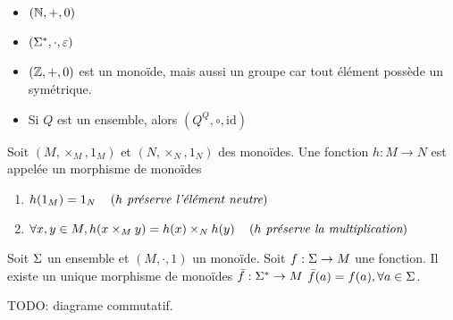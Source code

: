 \begin{exemple}
	\begin{itemize}
		\item $(\mathbb{N}, +, 0)$
		\item $(\Sigma^{*}, \cdot, \varepsilon)$
		\item $(\mathbb{Z}, +, 0)$ est un monoïde, mais aussi un groupe car tout élément possède un symétrique.
		\item Si $Q$ est un ensemble, alors $(Q ^ Q, \circ, \text{id})$
	\end{itemize}
\end{exemple}


\begin{definition}
	Soit $(M,\times_M, 1_M)$ et $(N,\times_N, 1_N)$ des monoïdes. Une fonction $h :  M \to N$ est appelée un morphisme de monoïdes \ssi
	\begin{enumerate}
		\item $h(1_M) = 1_N \quad\left(\textit{$h$ préserve l'élément neutre}\right)$
		\item $\forall x, y \in M, h (x \times_M y) = h(x) \times_N h(y) \quad\left(\textit{$h$ préserve la multiplication}\right)$
	\end{enumerate}
\end{definition}


\begin{prop}
	Soit $\Sigma$ un ensemble et $(M,\cdot, 1)$ un monoïde. Soit $f : \Sigma \to M$ une fonction. Il existe
	un unique morphisme de monoïdes $\bar f : \Sigma^{*} \to M$ \tq $\bar f (a) =  f (a),  \forall a \in \Sigma$.

	TODO: diagrame commutatif.
\end{prop}


